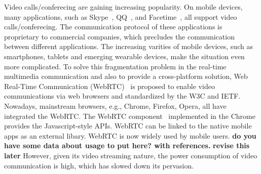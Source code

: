 Video calls/conferecing are gaining increasing popularity.  On mobile
devices, many applications, such as Skype~\cite{skype}, QQ~\cite{qq}, and
Facetime~\cite{facetime}, all support video
calls/conferecing. The communication protocol of these applications is
proprietary to commercial companies, which precludes the communication
between different applications.  The increasing varities of mobile
devices, such as smartphones, tablets and emerging wearable devices,
make the situation even more complicated. To solve this fragmentation
problem in the real-time multimedia communication and also to provide
a cross-platform solution, Web Real-Time Communication
(WebRTC)~\cite{webrtcstandard} is proposed to enable video
communications via web browsers and standardized by the W3C and
IETF. Nowadays, mainstream browsers, e.g., Chrome, Firefox, Opera, all have integrated the WebRTC. The WebRTC
component~\cite{webrtcproject} implemented in the Chrome provides the
Javascript-style APIs. WebRTC can be linked to the native mobile apps
as an external libary.  WebRTC is now widely used by mobile
users. {\bf do you have some data about usage to put here? with
  references.} {\bf revise this later} However, given its video
streaming nature, the power consumption of video communication is
high, which has slowed down its pervasion.







